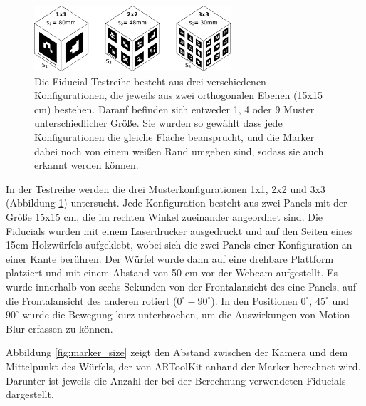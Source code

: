 \begin{figure}[h]
    \centering

   \includegraphics[width=0.65\textwidth]{../graphics/position/testcube_sides.svg}
    \caption[Fiducials der Testreihe]{ Die Fiducial-Testreihe besteht aus drei verschiedenen Konfigurationen, die jeweils aus zwei orthogonalen Ebenen (15x15 cm) bestehen. Darauf befinden sich entweder 1, 4 oder 9 Muster unterschiedlicher Größe.
      Sie wurden so gewählt dass jede Konfigurationen die gleiche Fläche beansprucht, und die Marker dabei noch von einem weißen Rand umgeben sind, sodass sie auch erkannt werden können.
    } 
    \label{fig:testcube_sides}
   \end{figure}

  In der Testreihe werden die drei Musterkonfigurationen 1x1, 2x2 und 3x3 (Abbildung \ref{fig:testcube_sides}) untersucht. 
   Jede Konfiguration besteht aus zwei Panels mit der Größe 15x15 cm, die im rechten Winkel zueinander angeordnet sind.
   Die Fiducials wurden mit einem Laserdrucker ausgedruckt und auf den Seiten eines 15cm Holzwürfels aufgeklebt, wobei sich die zwei Panels einer Konfiguration an einer Kante berühren.
   Der Würfel wurde dann auf eine drehbare Plattform platziert und mit einem Abstand von 50 cm vor der Webcam aufgestellt.
   Es wurde innerhalb von sechs Sekunden von der Frontalansicht des eine Panels, auf die Frontalansicht des anderen rotiert ($0^\circ - 90^\circ$).
   In den Positionen  $0^\circ$,  $45^\circ$ und $90^\circ$ wurde die Bewegung kurz unterbrochen, um die Auswirkungen von Motion-Blur erfassen zu können.
   
   Abbildung \ref{fig:marker_size} zeigt den Abstand zwischen der Kamera und dem Mittelpunkt des Würfels, der von ARToolKit anhand der Marker berechnet wird. 
   Darunter ist jeweils die Anzahl der bei der Berechnung verwendeten Fiducials dargestellt. 
 
